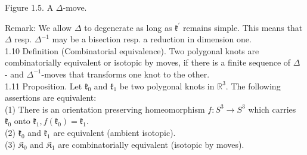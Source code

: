 \documentclass[10pt, letterpaper]{article}
\begin{document}
Figure 1.5. A $\Delta$-move.

Remark: We allow $\Delta$ to degenerate as long as $\mathfrak{k}^{\prime}$ remains simple. This means that $\Delta$ resp. $\Delta^{-1}$ may be a bisection resp. a reduction in dimension one.\\
1.10 Definition (Combinatorial equivalence). Two polygonal knots are combinatorially equivalent or isotopic by moves, if there is a finite sequence of $\Delta$ - and $\Delta^{-1}$-moves that transforms one knot to the other.\\
1.11 Proposition. Let $\mathfrak{k}_{0}$ and $\mathfrak{k}_{1}$ be two polygonal knots in $\mathbb{R}^{3}$. The following assertions are equivalent:\\
(1) There is an orientation preserving homeomorphism $f: S^{3} \rightarrow S^{3}$ which carries $\mathfrak{k}_{0}$ onto $\mathfrak{k}_{1}, f\left(\mathfrak{k}_{0}\right)=\mathfrak{k}_{1}$.\\
(2) $\mathfrak{k}_{0}$ and $\mathfrak{k}_{1}$ are equivalent (ambient isotopic).\\
(3) $\mathfrak{K}_{0}$ and $\mathfrak{K}_{1}$ are combinatorially equivalent (isotopic by moves).
\end{document}
